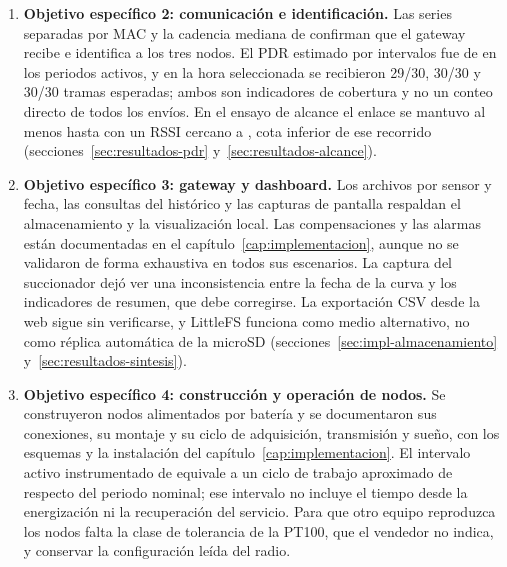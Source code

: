 \begin{enumerate}
\item \textbf{Objetivo específico 2: comunicación e identificación.} Las series separadas por MAC y la cadencia mediana de \PeriodoMediano{} confirman que el gateway recibe e identifica a los tres nodos. El PDR estimado por intervalos fue de \PDREstimado{} en los periodos activos, y en la hora seleccionada se recibieron 29/30, 30/30 y 30/30 tramas esperadas; ambos son indicadores de cobertura y no un conteo directo de todos los envíos. En el ensayo de alcance el enlace se mantuvo al menos hasta \DistanciaDemostrada{} con un RSSI cercano a \RSSILejano{}, cota inferior de ese recorrido (secciones~\ref{sec:resultados-pdr} y~\ref{sec:resultados-alcance}).

\item \textbf{Objetivo específico 3: gateway y dashboard.} Los archivos por sensor y fecha, las consultas del histórico y las capturas de pantalla respaldan el almacenamiento y la visualización local. Las compensaciones y las alarmas están documentadas en el capítulo~\ref{cap:implementacion}, aunque no se validaron de forma exhaustiva en todos sus escenarios. La captura del succionador dejó ver una inconsistencia entre la fecha de la curva y los indicadores de resumen, que debe corregirse. La exportación CSV desde la web sigue sin verificarse, y LittleFS funciona como medio alternativo, no como réplica automática de la microSD (secciones~\ref{sec:impl-almacenamiento} y~\ref{sec:resultados-sintesis}).

\item \textbf{Objetivo específico 4: construcción y operación de nodos.} Se construyeron \NumeroNodos{} nodos alimentados por batería y se documentaron sus conexiones, su montaje y su ciclo de adquisición, transmisión y sueño, con los esquemas y la instalación del capítulo~\ref{cap:implementacion}. El intervalo activo instrumentado de \TiempoActivo{} equivale a un ciclo de trabajo aproximado de \CicloTrabajo{} respecto del periodo nominal; ese intervalo no incluye el tiempo desde la energización ni la recuperación del servicio. Para que otro equipo reproduzca los nodos falta la clase de tolerancia de la PT100, que el vendedor no indica, y conservar la configuración leída del radio.


\end{enumerate}
